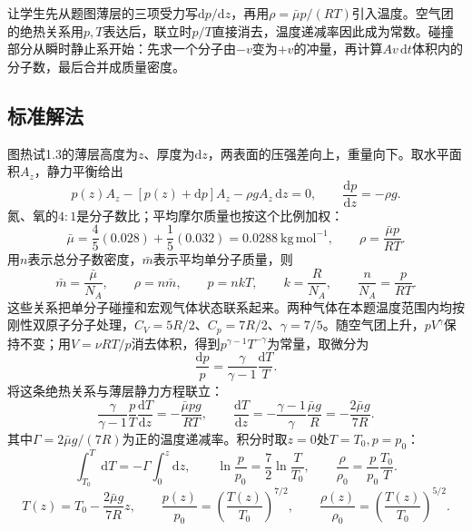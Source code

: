 \documentclass[UTF8,fontset=fandol,a4paper,11pt]{ctexart}
\begin{document}
让学生先从题图薄层的三项受力写$\mathrm dp/\mathrm dz$，再用$\rho=\bar\mu p/(RT)$引入温度。空气团的绝热关系用$p,T$表达后，联立时$p/T$直接消去，温度递减率因此成为常数。碰撞部分从瞬时静止系开始：先求一个分子由$-v$变为$+v$的冲量，再计算$Av\,\mathrm dt$体积内的分子数，最后合并成质量密度。



\subsection*{标准解法}


图热试1.3的薄层高度为$z$、厚度为$\mathrm dz$，两表面的压强差向上，重量向下。取水平面积$A_z$，静力平衡给出
\[
p(z)A_z-[p(z)+\mathrm dp]A_z-\rho g A_z\,\mathrm dz=0,
\qquad
\boxed{\frac{\mathrm dp}{\mathrm dz}=-\rho g}.
\]
氮、氧的$4:1$是分子数比；平均摩尔质量也按这个比例加权：
\[
\bar\mu=\frac45(0.028)+\frac15(0.032)
=0.0288\ \mathrm{kg\,mol^{-1}},
\qquad
\rho=\frac{\bar\mu p}{RT}.
\]
用$n$表示总分子数密度，$\bar m$表示平均单分子质量，则
\[
\bar m=\frac{\bar\mu}{N_A},\qquad \rho=n\bar m,\qquad
p=nkT,\qquad k=\frac R{N_A},\qquad
\frac n{N_A}=\frac p{RT}.
\]
这些关系把单分子碰撞和宏观气体状态联系起来。两种气体在本题温度范围内均按刚性双原子分子处理，$C_V=5R/2$、$C_p=7R/2$、$\gamma=7/5$。随空气团上升，$pV^\gamma$保持不变；用$V=\nu RT/p$消去体积，得到$p^{\gamma-1}T^{-\gamma}$为常量，取微分为
\[
\frac{\mathrm dp}{p}=\frac{\gamma}{\gamma-1}\frac{\mathrm dT}{T}.
\]
将这条绝热关系与薄层静力方程联立：
\[
\frac{\gamma}{\gamma-1}\frac{p}{T}\frac{\mathrm dT}{\mathrm dz}
=-\frac{\bar\mu p g}{RT},
\qquad
\boxed{\frac{\mathrm dT}{\mathrm dz}
=-\frac{\gamma-1}{\gamma}\frac{\bar\mu g}{R}
=-\frac{2\bar\mu g}{7R}}.
\]
其中$\Gamma=2\bar\mu g/(7R)$为正的温度递减率。积分时取$z=0$处$T=T_0,p=p_0$：
\[
\int_{T_0}^{T}\mathrm dT=-\Gamma\int_0^z\mathrm dz,\qquad
\ln\frac p{p_0}=\frac72\ln\frac T{T_0},\qquad
\frac{\rho}{\rho_0}=\frac p{p_0}\frac{T_0}{T}.
\]
\[
T(z)=T_0-\frac{2\bar\mu g}{7R}z,\qquad
\frac{p(z)}{p_0}=\left(\frac{T(z)}{T_0}\right)^{7/2},
\qquad
\frac{\rho(z)}{\rho_0}=\left(\frac{T(z)}{T_0}\right)^{5/2}.
\]
\end{document}
